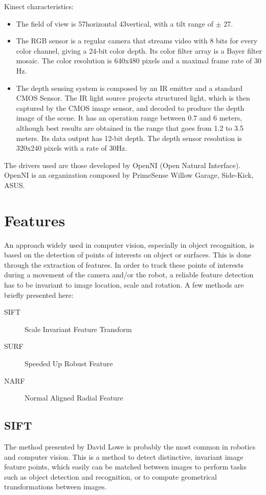 Kinect characteristics:
\begin{itemize}
\item The field of view is 57\textdegree horizontal 43\textdegree vertical, with a tilt range of $\pm$ 27\textdegree.
\item The RGB sensor is a regular camera that streams video with 8 bits for every color channel, giving a 24-bit color depth. Its color filter array is a Bayer filter mosaic. The color resolution is 640x480 pixels and a maximal frame rate of 30 Hz.
\item The depth sensing system is composed by an IR emitter and a standard CMOS Sensor. The IR light source projects structured light, which is then captured by the CMOS image sensor, and decoded to produce the depth image of the scene. It has an operation range between 0.7 and 6 meters, although best results are obtained in the range that goes from 1.2 to 3.5 meters. Its data output has 12-bit depth. The depth sensor resolution is 320x240 pixels with a rate of 30Hz.
\end{itemize}

The drivers used are those developed by OpenNI (Open Natural Interface). OpenNI is an organization composed by PrimeSense Willow Garage, Side-Kick, ASUS.


\section{Features}

An approach widely used in computer vision, especially in object recognition, is based on the detection of points of interests on object or surfaces. This is done through the extraction of features. In order to track these points of interests during a movement of the camera and/or the robot, a reliable feature detection has to be invariant to image location, scale and rotation. A few methods are briefly presented here:
\begin{description}
\item[SIFT] Scale Invariant Feature Transform
\item[SURF] Speeded Up Robust Feature
\item[NARF] Normal Aligned Radial Feature
\end{description}

\subsection{SIFT}
The method presented by David Lowe \cite{lowesift} is probably the most common in robotics and computer vision.
This is a method to detect distinctive, invariant image feature points, which easily can be matched between images to perform tasks such as object detection and recognition, or to compute geometrical transformations between images.

